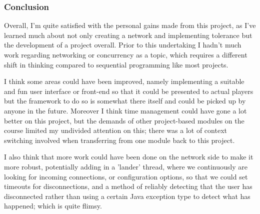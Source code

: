 \documentclass[11pt]{article}
\begin{document}
\subsubsection*{Conclusion}

Overall, I'm quite satisfied with the personal gains made from this project, as I've learned much about not only creating a network and implementing tolerance but the development of a project overall. Prior to this undertaking I hadn't much work regarding networking or concurrency as a topic, which requires a different shift in thinking compared to sequential programming like most projects.

I think some areas could have been improved, namely implementing a suitable and fun user interface or front-end so that it could be presented to actual players but the framework to do so is somewhat there itself and could be picked up by anyone in the future. Moreover I think time management could have gone a lot better on this project, but the demands of other project-based modules on the course limited my undivided attention on this; there was a lot of context switching involved when transferring from one module back to this project. 

I also think that more work could have been done on the network side to make it more robust, potentially adding in a 'lander' thread, where we continuously are looking for incoming connections, or configuration options, so that we could set timeouts for disconnections, and a method of reliably detecting that the user has disconnected rather than using a certain Java exception type to detect what has happened; which is quite flimsy. 
\end{document}
